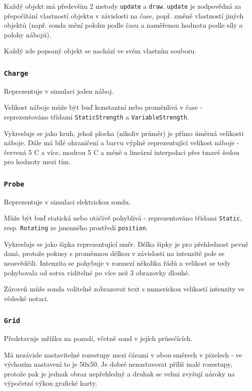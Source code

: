 \documentclass[12pt,a4paper]{paper}
\newcommand{\code}[1]{\texttt{#1}}
\begin{document}
Každý objekt má především 2 metody \code{update} a \code{draw}. \code{update} je
zodpovědná za přepočítání vlastností objektu v závislosti na čase, popř. změně
vlastností jiných objektů (např. sonda mění polohu podle času a naměřenou
hodnotu podle síly a polohy nábojů).

Každý zde popsaný objekt se nachází ve svém vlastním souboru.

\subsubsection{\code{Charge}}

Reprezentuje v simulaci jeden náboj. 

Velikost náboje může být buď konstantní nebo proměnlivá v čase - reprezentováno
třídami \code{StaticStrength} a \code{VariableStrength}. 

Vykresluje se jako kruh, jehož plocha (nikoliv průměr) je přímo úměrná velikosti
náboje. Dále má bílé ohraničení a barvu výplně reprezentující velikost náboje -
červená 5 C a více, modrou 5 C a méně a lineární interpolaci přes tmavě šedou
pro hodnoty mezi tím.

\subsubsection{\code{Probe}}

Reprezentuje v simulaci elektrickou sondu.

Může být buď statická nebo otáčivě pohyblivá - reprezentováno třídami
\code{Static}, resp. \code{Rotating} ze jmenného prostředí \code{position}.

Vykresluje se jako šipka reprezentující směr. Délka šipky je pro přehlednost
pevně daná, protože pokusy s proměnnou délkou v závislosti na intenzitě pole se
neosvědčili. Intenzita se pohybuje v rozmezí několika řádů a velikost se tedy
pohybovala od sotva viditelné po více než 3 obrazovky dlouhé.

Zároveň může sonda volitelně zobrazovat text s numerickou velikostí intenzity ve
vědecké notaci.

\subsubsection{\code{Grid}}

Představuje mřížku na pozadí, včetně sond v jejích průsečících.

Má nezávisle nastavitelné rozestupy mezi čárami v obou směrech v pixelech - ve
výchozím nastavení to je 50x50. Je dobré nenastavovat příliš malé rozestupy,
protože pak je jednak obraz nepřehledný a druhak se velmi zvyšují nároky na
výpočetní výkon grafické karty.
\end{document}
